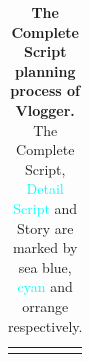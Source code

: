 \begin{table}[h!]
\begin{minipage}{0.98\linewidth}
\begin{tcolorbox}
\begin{tabular}{p{0.99\linewidth}}
\begin{minipage}{0.99\linewidth}
 \end{minipage}
        \end{tabular}
    \end{tcolorbox}
    \vspace{-2mm}
    \caption{\textbf{The Complete Script planning process of Vlogger.} The \textcolor[RGB]{52, 152, 219}{Complete Script}, \textcolor{cyan}{Detail Script} and \textcolor[RGB]{243, 156, 18}{Story} are marked by \textcolor[RGB]{52, 152, 219}{sea blue}, \textcolor{cyan}{cyan} and \textcolor[RGB]{243, 156, 18}{orrange} respectively.
    }
    \label{tab:instruction_3}
\end{minipage}
\end{table}